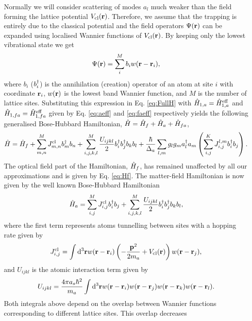 Normally we will consider scattering of modes $a_l$ much weaker than
the field forming the lattice potential
$V_\mathrm{cl}(\mathbf{r})$. Therefore, we assume that the trapping is
entirely due to the classical potential and the field operators
$\Psi(\mathbf{r})$ can be expanded using localised Wannier functions of
$V_\mathrm{cl}(\mathbf{r})$. By keeping only the lowest vibrational state
we get
\begin{equation}
  \Psi(\mathbf{r}) = \sum_i^M b_i w(\mathbf{r} - \mathbf{r}_i),
\end{equation} 
where $b_i$ ($b^\dagger_i$) is the annihilation (creation) operator of an
atom at site $i$ with coordinate $\mathbf{r}_i$, $w(\mathbf{r})$ is the lowest
band Wannier function, and $M$ is the number of lattice
sites. Substituting this expression in Eq. \eqref{eq:FullH} with
$\hat{H}_{1,a} = \hat{H}_{1,a}^\mathrm{eff}$ and
$\hat{H}_{1,fa} = \hat{H}_{1,fa}^\mathrm{eff}$ given by Eq. \eqref{eq:aeff} and
\eqref{eq:faeff} respectively yields the following generalised
Bose-Hubbard Hamiltonian, $\hat{H} = \hat{H}_f + \hat{H}_a + \hat{H}_{fa}$,
\begin{equation}
  \hat{H} = \hat{H}_f + \sum_{m,n}^M J^\mathrm{cl}_{m,n} b^\dagger_m b_n + 
  \sum_{i,j,k,l}^M \frac{U_{ijkl}}{2} b^\dagger_i b^\dagger_j b_k b_l + 
  \frac{\hbar}{\Delta_a} \sum_{l,m} g_l g_m a^\dagger_l a_m 
  \left( \sum_{i,j}^K J^{l,m}_{i,j} b^\dagger_i b_j \right).
\end{equation}
The optical field part of the Hamiltonian, $\hat{H}_f$, has remained
unaffected by all our approximations and is given by
Eq. \eqref{eq:Hf}. The matter-field Hamiltonian is now given by the
well known Bose-Hubbard Hamiltonian
\begin{equation}
  \hat{H}_a = \sum_{i,j}^M J^\mathrm{cl}_{i,j} b^\dagger_i b_j + 
  \sum_{i,j,k,l}^M \frac{U_{ijkl}}{2} b^\dagger_i b^\dagger_j b_k b_l,
\end{equation}
where the first term represents atoms tunnelling between sites with a
hopping rate given by
\begin{equation}
  J^\mathrm{cl}_{i,j} = \int \mathrm{d}^3 \mathbf{r} w (\mathbf{r} - \mathbf{r}_i ) 
  \left( -\frac{\mathbf{p}^2}{2 m_a} + V_\mathrm{cl}(\mathbf{r}) \right) w(\mathbf{r}
  - \mathbf{r}_j),
\end{equation}
and $U_{ijkl}$ is the atomic interaction term given by
\begin{equation}
  U_{ijkl} = \frac{4 \pi a_s \hbar^2}{m_a} \int \mathrm{d}^3 \mathbf{r} 
  w(\mathbf{r} - \mathbf{r}_i) w(\mathbf{r} - \mathbf{r}_j) w(\mathbf{r} - \mathbf{r}_k) w(\mathbf{r} - \mathbf{r}_l).
\end{equation}
Both integrals above depend on the overlap between Wannier functions
corresponding to different lattice sites. This overlap decreases
